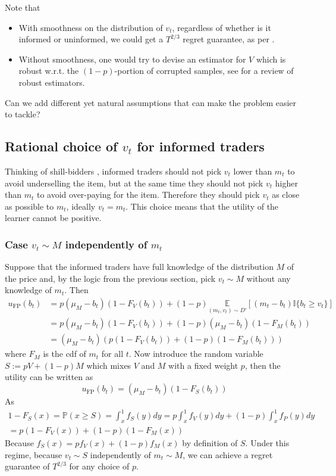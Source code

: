 \documentclass[a4paper,11pt]{article}
\begin{document}
Note that
\begin{itemize}
    \item With smoothness on the distribution of $v_t$, regardless of whether is it informed or uninformed, we could get a $T^{2/3}$ regret guarantee, as per \citep{cesa-bianchiMarketMakingRegret2024}.
    \item Without smoothness, one would try to devise an estimator for $V$ which is robust w.r.t. the $(1-p)$-portion of corrupted samples, see \citep{lugosi_mean_2019} for a review of robust estimators.
\end{itemize}
Can we add different yet natural assumptions that can make the problem easier to tackle?

\subsection{Rational choice of $v_t$ for informed traders}
Thinking of shill-bidders \citep{Komo2024-em}, informed traders should not pick $v_t$ lower than $m_t$ to avoid underselling the item, but at the same time they should not pick $v_t$ higher than $m_t$ to avoid over-paying for the item. Therefore they should pick $v_t$ as close as possible to $m_t$, ideally $v_t = m_t$. This choice means that the utility of the learner cannot be positive.

\subsubsection{Case $v_t \sim M$ independently of $m_t$}
Suppose that the informed traders have full knowledge of the distribution $M$ of the price and, by the logic from the previous section, pick $v_t \sim M$ without any knowledge of $m_t$. Then
\begin{align*}
	u_\text{FP}(b_t)
&=
	p (\mu_M - b_t)(1 - F_V(b_t))
	+ (1-p) \underset{(m_t, v_t) \sim D'}{\mathbb{E}}[(m_t - b_t)\mathbb{I}\{b_t \ge v_t\}]
\\ &=
	p (\mu_M - b_t)(1 - F_V(b_t))
	+ (1-p) (\mu_M - b_t)(1 - F_M(b_t))
\\ &=
	(\mu_M - b_t)( p (1 - F_V(b_t)) + (1-p)(1 - F_M(b_t)) )
\end{align*}
where $F_M$ is the cdf of $m_t$ for all $t$.
Now introduce the random variable $S := p V + (1 - p) M$ which mixes $V$ and $M$ with a fixed weight $p$, then the utility can be written as
$$
	u_\text{FP}(b_t)
=
	(\mu_M - b_t) (1 - F_S(b_t))
$$
As
\begin{multline*}
	1 - F_S(x)
=
	\mathbb{P}(x \ge S)
=
	\int_x^1 f_S(y) dy
=
	p \int_x^1 f_V(y) dy + (1-p) \int_x^1 f_P(y) dy
\\ =
	p (1 - F_V(x)) + (1-p) (1 - F_M(x))
\end{multline*}
Because $f_S(x) = p f_V(x) + (1 - p) f_M(x)$ by definition of $S$. Under this regime, because $v_t \sim S$ independently of $m_t \sim M$, we can achieve a regret guarantee of $T^{2/3}$ for any choice of $p$. 
\end{document}
